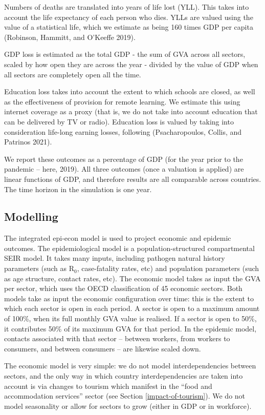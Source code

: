 \documentclass[
]{article}
\begin{document}
Numbers of deaths are translated into years of life lost (YLL). This takes into account the life expectancy of each person who dies. YLLs are valued using the value of a statistical life, which we estimate as being 160 times GDP per capita (Robinson, Hammitt, and O'Keeffe 2019).

GDP loss is estimated as the total GDP - the sum of GVA across all sectors, scaled by how open they are across the year - divided by the value of GDP when all sectors are completely open all the time.

Education loss takes into account the extent to which schools are closed, as well as the effectiveness of provision for remote learning. We estimate this using internet coverage as a proxy (that is, we do not take into account education that can be delivered by TV or radio). Education loss is valued by taking into consideration life-long earning losses, following (Psacharopoulos, Collis, and Patrinos 2021).

We report these outcomes as a percentage of GDP (for the year prior to the pandemic -- here, 2019). All three outcomes (once a valuation is applied) are linear functions of GDP, and therefore results are all comparable across countries. The time horizon in the simulation is one year.

\hypertarget{modelling}{%
\subsection{Modelling}\label{modelling}}

The integrated epi-econ model is used to project economic and epidemic outcomes. The epidemiological model is a population-structured compartmental SEIR model. It takes many inputs, including pathogen natural history parameters (such as R\(_0\), case-fatality rates, etc) and population parameters (such as age structure, contact rates, etc). The economic model takes as input the GVA per sector, which uses the OECD classification of 45 economic sectors. Both models take as input the economic configuration over time: this is the extent to which each sector is open in each period. A sector is open to a maximum amount of 100\%, when its full monthly GVA value is realised. If a sector is open to 50\%, it contributes 50\% of its maximum GVA for that period. In the epidemic model, contacts associated with that sector -- between workers, from workers to consumers, and between consumers -- are likewise scaled down.

The economic model is very simple: we do not model interdependencies between sectors, and the only way in which country interdependencies are taken into account is via changes to tourism which manifest in the ``food and accommodation services'' sector (see Section \ref{impact-of-tourism}). We do not model seasonality or allow for sectors to grow (either in GDP or in workforce).
\end{document}
